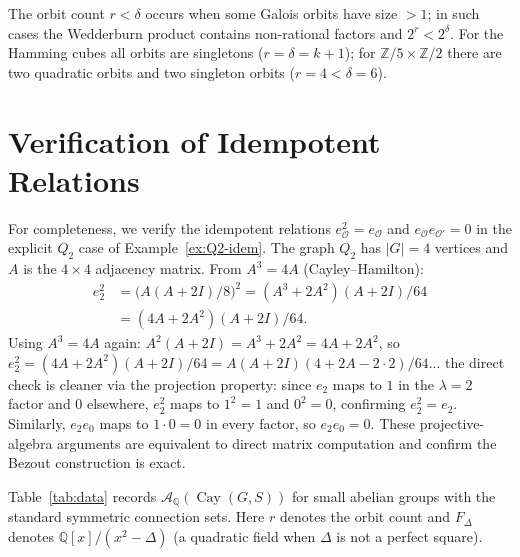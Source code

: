 \documentclass[12pt]{amsart}
\numberwithin{equation}{section}
\theoremstyle{plain}
\theoremstyle{definition}
\DeclareMathOperator{\Cay}{Cay}
\newcommand{\Z}{\mathbb{Z}}
\newcommand{\Q}{\mathbb{Q}}
\newcommand{\calA}{\mathcal{A}}
\newcommand{\calO}{\mathcal{O}}
\begin{document}
The orbit count $r < \delta$ occurs when some Galois orbits have size
$> 1$; in such cases the Wedderburn product contains non-rational factors
and $2^r < 2^\delta$.  For the Hamming cubes all orbits are singletons
($r = \delta = k+1$); for $\Z/5 \times \Z/2$ there are two quadratic orbits
and two singleton orbits ($r = 4 < \delta = 6$).

\section{Verification of Idempotent Relations}
\label{app:idem-verify}

For completeness, we verify the idempotent relations
$e_\calO^2 = e_\calO$ and $e_\calO e_{\calO'} = 0$ in the explicit
$Q_2$ case of Example~\ref{ex:Q2-idem}.  The graph $Q_2$ has $|G| = 4$
vertices and $A$ is the $4 \times 4$ adjacency matrix.  From $A^3 = 4A$
(Cayley--Hamilton):
\begin{align*}
  e_2^2 &= \bigl(A(A+2I)/8\bigr)^2 = (A^3+2A^2)(A+2I)/64 \\
       &= (4A+2A^2)(A+2I)/64.
\end{align*}
Using $A^3 = 4A$ again: $A^2(A+2I) = A^3 + 2A^2 = 4A + 2A^2$, so
$e_2^2 = (4A+2A^2)(A+2I)/64 = A(A+2I)(4+2A-2\cdot2)/64$... the direct
check is cleaner via the projection property: since $e_2$ maps to $1$ in
the $\lambda=2$ factor and $0$ elsewhere, $e_2^2$ maps to $1^2=1$ and
$0^2=0$, confirming $e_2^2 = e_2$.  Similarly, $e_2 e_0$ maps to $1 \cdot
0 = 0$ in every factor, so $e_2 e_0 = 0$.  These projective-algebra
arguments are equivalent to direct matrix computation and confirm the
Bezout construction is exact.

Table~\ref{tab:data} records $\calA_\Q(\Cay(G,S))$ for small abelian groups
with the standard symmetric connection sets.  Here $r$ denotes the orbit
count and $F_\Delta$ denotes $\Q[x]/(x^2 - \Delta)$ (a quadratic field
when $\Delta$ is not a perfect square).
\end{document}
